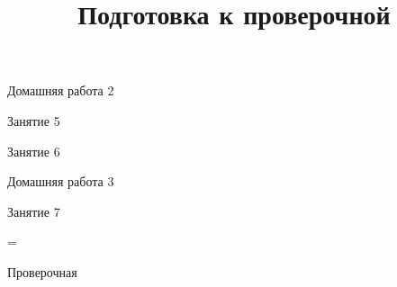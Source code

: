 \begin{homework}[number=2]
	\begin{listofex}
		\item Домашняя работа 2
	\end{listofex}
\end{homework}

\begin{class}[number=5]
	\begin{listofex}
		\item Занятие 5
	\end{listofex}
\end{class}

\begin{class}[number=6]
	\begin{listofex}
		\item Занятие 6
	\end{listofex}
\end{class}

\begin{homework}[number=3]
	\begin{listofex}
		\item Домашняя работа 3
	\end{listofex}
\end{homework}

\begin{class}[number=7]
	\title{Подготовка к проверочной}
	\begin{listofex}
		\item Занятие 7
	\end{listofex}
\end{class}

=%
\begin{exam}
	\begin{listofex}
		\item Проверочная
	\end{listofex}
\end{exam}

